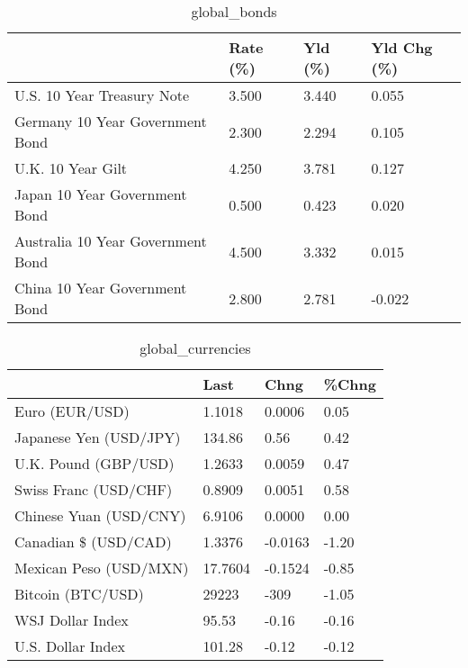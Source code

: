 \documentclass{article}%
\begin{document}
%


\begin{table}[htbp]%
\caption{global\_bonds}%
\centering%
\begin{adjustbox}{width=1\textwidth}%
\begin{tabular}{llll}
\toprule
                                  & Rate (\%) & Yld (\%) & Yld Chg (\%) \\
\midrule
       U.S. 10 Year Treasury Note &    3.500 &   3.440 &       0.055 \\
  Germany 10 Year Government Bond &    2.300 &   2.294 &       0.105 \\
                U.K. 10 Year Gilt &    4.250 &   3.781 &       0.127 \\
    Japan 10 Year Government Bond &    0.500 &   0.423 &       0.020 \\
Australia 10 Year Government Bond &    4.500 &   3.332 &       0.015 \\
    China 10 Year Government Bond &    2.800 &   2.781 &      -0.022 \\
\bottomrule
\end{tabular}
%
\end{adjustbox}%
\end{table}

%


\begin{table}[htbp]%
\caption{global\_currencies}%
\centering%
\begin{adjustbox}{width=1\textwidth}%
\begin{tabular}{llll}
\toprule
                       &    Last &    Chng & \%Chng \\
\midrule
        Euro (EUR/USD) &  1.1018 &  0.0006 &  0.05 \\
Japanese Yen (USD/JPY) &  134.86 &    0.56 &  0.42 \\
  U.K. Pound (GBP/USD) &  1.2633 &  0.0059 &  0.47 \\
 Swiss Franc (USD/CHF) &  0.8909 &  0.0051 &  0.58 \\
Chinese Yuan (USD/CNY) &  6.9106 &  0.0000 &  0.00 \\
  Canadian \$ (USD/CAD) &  1.3376 & -0.0163 & -1.20 \\
Mexican Peso (USD/MXN) & 17.7604 & -0.1524 & -0.85 \\
     Bitcoin (BTC/USD) &   29223 &    -309 & -1.05 \\
      WSJ Dollar Index &   95.53 &   -0.16 & -0.16 \\
     U.S. Dollar Index &  101.28 &   -0.12 & -0.12 \\
\bottomrule
\end{tabular}
%
\end{adjustbox}%
\end{table}
\end{document}
